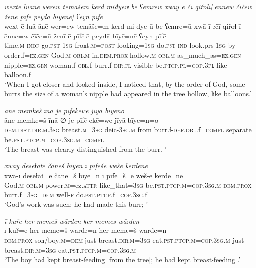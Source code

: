 \ea \label{ZQ.39}
\textit{wextē luānē werew temāšem kerd miđyew be ʕemrew xwāy e čī qiřolī| ēnnew čīčew ženē pīfē peydā bīyenē| ʕeyn pīfē} \\ 
\gll wext-ē luā-ānē wer=ew temāše=m kerd mi-đye-ū be ʕemre=ū xwā-ī ečī qiřoɫ-ī ēnne=w čīče=ū ženī-ē pīfē-ē peydā bīyē=nē ʕeyn pīfē \\ 
 time\textsc{.m}\textsc{-indf} go\textsc{.pst}\textsc{-\textsc{1sg}} front\textsc{.m}\textsc{=\textsc{post}} looking\textsc{=\textsc{1sg}} do\textsc{.pst} \textsc{ind-}look.prs\textsc{-\textsc{1sg}} by order.f\textsc{=ez.gen} God\textsc{.m}\textsc{-obl}\textsc{.m} in.\textsc{dem.prox} hollow\textsc{.m}\textsc{-obl}\textsc{.m} as\_much\_as\textsc{=ez.gen} nipple\textsc{=ez.gen} woman.f\textsc{-obl}.f burr.f\textsc{-dir}\textsc{.pl} visible be\textsc{.ptcp}\textsc{.pl}\textsc{=cop}\textsc{.3pl} like balloon.f \\ 
\glt `When I got closer and looked inside, I noticed that, by the order of God, some burrs the size of a woman's nipple had appeared in the tree hollow, like balloons.'
\z 
 
\ea \label{ZQ.41}
\textit{āne memkeš īnā je pīfekēwe jīyā bīyeno} \\ 
\gll āne memke=š īnā-∅ je pīfē-ekē=we jīyā bīye=n=o \\ 
 \textsc{dem.dist}\textsc{.dir}\textsc{.m}\textsc{.3sg} breast\textsc{.m}\textsc{=3sg} deic\textsc{-3sg}\textsc{.m} from burr.f\textsc{-def}\textsc{.obl}.f\textsc{=compl} separate be\textsc{.pst}\textsc{.ptcp}\textsc{.m}\textsc{=cop}\textsc{.3sg}\textsc{.m}\textsc{=compl} \\ 
\glt `The breast was clearly distinguished from the burr. '
\z 
 
\ea \label{ZQ.42}
\textit{xwāy deseɫātē čāneš bīyen ī pīfēše weše kerdēne} \\ 
\gll xwā-ī deseɫāt=ē čāne=š bīye=n ī pīfē=š=e weš-e kerdē=ne \\ 
 God\textsc{.m}\textsc{-obl}\textsc{.m} power\textsc{.m}=ez.\textsc{attr} like\_that\textsc{=3sg} be\textsc{.pst}\textsc{.ptcp}\textsc{.m}\textsc{=cop}\textsc{.3sg}\textsc{.m} \textsc{dem.prox} burr.f\textsc{=3sg}\textsc{=dem} well\textsc{-f} do\textsc{.pst}\textsc{.ptcp}.f\textsc{=cop}\textsc{.3sg}.f \\ 
\glt `God’s work was such: he had made this burr; '
\z 
 
\ea \label{ZQ.44}
\textit{ī kuře her memeš wārden her memes wārden} \\ 
\gll ī kuř=e her meme=š wārde=n her meme=š wārde=n \\ 
 \textsc{dem.prox} son/boy\textsc{.m}\textsc{=dem} just breast\textsc{.dir}\textsc{.m}\textsc{=3sg} eat\textsc{.pst}\textsc{.ptcp}\textsc{.m}\textsc{=cop}\textsc{.3sg}\textsc{.m} just breast\textsc{.dir}\textsc{.m}\textsc{=3sg} eat\textsc{.pst}\textsc{.ptcp}\textsc{.m}\textsc{=cop}\textsc{.3sg}\textsc{.m} \\ 
\glt `The boy had kept breast-feeding [from the tree]; he had kept breast-feeding .'
\z 
 
